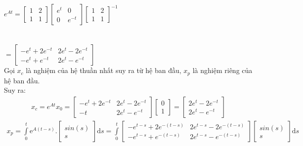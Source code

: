 \hspace*{4cm}$e^{At}=
\begin{bmatrix}
    1 &2\\
    1 & 1
\end{bmatrix}
\begin{bmatrix}
    e^t & 0\\
    0 & e^{-t}
\end{bmatrix}
\begin{bmatrix}
    1 &2\\
    1 & 1
\end{bmatrix}^{-1}
$\\\\\\
\hspace*{4.7cm}$=
\begin{bmatrix}
    -e^t+2e^{-t} & 2e^t-2e^{-t}\\
    -e^t+e^{-t} & 2e^t-e^{-t}
\end{bmatrix}
$\\
Gọi $x_c$ là nghiệm của hệ thuần nhất suy ra từ hệ ban đầu, $x_p$ là nghiệm riêng của hệ ban đầu.\\
Suy ra:\\
\begin{align*}
x_c=e^{At}x_0=
    \begin{bmatrix}
    -e^t+2e^{-t} & 2e^t-2e^{-t}\\
    -t & 2e^t-e^{-t}
\end{bmatrix}
\begin{bmatrix}
    0\\
    1
\end{bmatrix}
=\begin{bmatrix}
    2e^t-2e^{-t}\\
    2e^t-e^{-t}
\end{bmatrix}
\end{align*}
\begin{align*}
    x_p=\displaystyle\int\limits_{0}^{t} \mathrm{e}^{A(t-s)}.
    \begin{bmatrix}
    sin(s)\\
    s
\end{bmatrix}
    \mathrm{d}s
=\displaystyle\int\limits_{0}^{t}
\begin{bmatrix}
    -e^{t-s}+2e^{-(t-s)} & 2e^{t-s}-2e^{-(t-s)}\\
    -e^{t-s}+e^{-(t-s)} & 2e^{t-s}-e^{-(t-s)}
\end{bmatrix}
\begin{bmatrix}
    sin(s)\\
    s
\end{bmatrix}
\mathrm{d}s
\end{align*}
